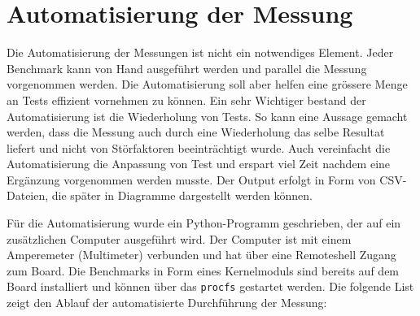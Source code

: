 \section{Automatisierung der Messung}
\label{sec:automatisierung}

Die Automatisierung der Messungen ist nicht ein notwendiges Element. Jeder Benchmark kann von Hand ausgeführt werden und parallel die Messung vorgenommen werden. Die Automatisierung soll aber helfen eine grössere Menge an Tests effizient vornehmen zu können. Ein sehr Wichtiger bestand der Automatisierung ist die Wiederholung von Tests. So kann eine Aussage gemacht werden, dass die Messung auch durch eine Wiederholung das selbe Resultat liefert und nicht von Störfaktoren beeinträchtigt wurde. Auch vereinfacht die Automatisierung die Anpassung von Test und erspart viel Zeit nachdem eine Ergänzung vorgenommen werden musste. Der Output erfolgt in Form von CSV-Dateien, die später in Diagramme dargestellt werden können.
\par
Für die Automatisierung wurde ein Python-Programm geschrieben, der auf ein zusätzlichen Computer ausgeführt wird. Der Computer ist mit einem Amperemeter (Multimeter) verbunden und hat über eine Remoteshell Zugang zum Board. Die Benchmarks in Form eines Kernelmoduls sind bereits auf dem Board installiert und können über das \texttt{procfs} gestartet werden. Die folgende List zeigt den Ablauf der automatisierte Durchführung der Messung:


